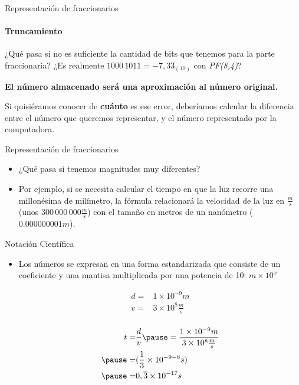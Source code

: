 \documentclass[11pt,a4paper,spanish]{beamer}
\begin{document}
\begin{frame}{Representación de fraccionarios}
\framesubtitle{Truncamiento}

    ¿Qué pasa si no es suficiente la cantidad de bits que tenemos para la parte fraccionaria?
        ¿Es realmente $1000\,1011 = -7,33_{(10)}$ con \emph{PF(8,4)}?
    \pause

    \textbf{El número almacenado será una aproximación al número original.}

    \pause

    Si quisiéramos conocer de \textbf{cuánto} es ese error, deberíamos
    calcular la diferencia entre el número que queremos representar, y el
    número representado por la computadora.

\end{frame}

\begin{frame}{Representación de fraccionarios}
\begin{itemize}
    \item ¿Qué pasa si tenemos magnitudes muy diferentes?
    \pause
    \item \small Por ejemplo, si se necesita calcular el tiempo en que la luz
        recorre una millonésima de milímetro, la fórmula relacionará la
        velocidad de la luz en $\frac{m}{s}$ (unos $300\,000\,000
        \frac{m}{s}$) con el tamaño en metros de un nanómetro ($0.000000001
        m$).
\end{itemize}
\end{frame}

\begin{frame}{Notación Científica}
\begin{itemize}
    \item Los números se expresan en una forma estandarizada que consiste de
        un coeficiente y una mantisa multiplicada por una potencia de 10: $m
        \times 10^{x}$
\pause

\begin{equation*}
\begin{aligned}
    d =& 1\times{}10^{-9}m\\
    v =& 3\times{}10^8\frac{m}{s}\\
\end{aligned}
\end{equation*}
\pause

\begin{equation*}
\begin{aligned}
    t =& \frac{d}{v} \pause =
    \frac{1\times 10^{-9}m}{3\times 10^{8}\frac{m}{s}}\\
    \pause
      =& (\frac{1}{3} \times 10^{-9-8}s)\\
    \pause
      =& 0,\overline{3}\times10^{-17}s\\
\end{aligned}
\end{equation*}

\end{itemize}
\end{frame}
\end{document}
